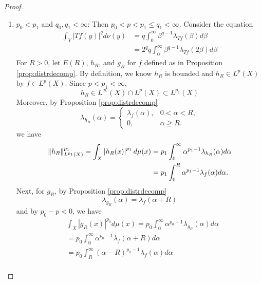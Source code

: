 \begin{proof}
\begin{enumerate}[label=(\Roman*)]
		\item $p_0 < p_1$ and $q_0,q_1 < \infty$: Then $p_0 < p < p_1 \leq q_1 < \infty$. Consider the equation
		\begin{equation*}
			\begin{aligned}
				\int_Y|T f(y)|^q d \nu(y) & =q \int_0^{\infty} \beta^{q-1} \lambda_{T f}(\beta) d \beta \\
				& =2^q q \int_0^{\infty} \beta^{q-1} \lambda_{T f}(2 \beta) d \beta
			\end{aligned}
		\end{equation*}
		For $R > 0$, let $E(R)$, $h_R$, and $g_R$ for $f$ defined as in Proposition \ref{prop:distrdecomp}. By definition, we know $h_R$ is bounded and $h_R \in L^p(X)$ by $f \in L^p(X)$. Since $p < p_1 < \infty$,
		\begin{equation*}
			h_R \in L^\infty(X) \cap L^p(X) \subset L^{p_1}(X)
		\end{equation*}
		Moreover, by Proposition \ref{prop:distrdecomp}
		\begin{equation*}
			\lambda_{h_R}(\alpha)= \begin{cases}\lambda_f(\alpha), & 0<\alpha<R, \\ 0, & \alpha \geq R.\end{cases}
		\end{equation*}
		we have
		\begin{equation*}
			\begin{aligned}
				\left\lVert h_R\right\lVert_{L^{p_1}(X)}^{p_1} = \int_X\left|h_R(x)\right|^{p_1} d \mu(x) & =p_1 \int_0^{\infty} \alpha^{p_1-1} \lambda_{h_R}(\alpha) d \alpha \\
				& =p_1 \int_0^R \alpha^{p_1-1} \lambda_f(\alpha) d \alpha .
			\end{aligned}
		\end{equation*}
		Next, for $g_R$, by Proposition \ref{prop:distrdecomp}
		\begin{equation*}
			\lambda_{g_R}(\alpha)=\lambda_f(\alpha+R)
		\end{equation*}
		and by $p_0 - p < 0$, we have
		\begin{equation*}
			\begin{aligned}
				& \int_X\left|g_R(x)\right|^{p_0} d \mu(x)=p_0 \int_0^{\infty} \alpha^{p_0-1} \lambda_{g_R}(\alpha) d \alpha \\
				& =p_0 \int_0^{\infty} \alpha^{p_0-1} \lambda_f(\alpha+R) d \alpha \\
				& =p_0 \int_R^{\infty}(\alpha-R)^{p_0-1} \lambda_f(\alpha) d \alpha \\

\end{aligned}
\end{equation*}
\end{enumerate}
\end{proof}
